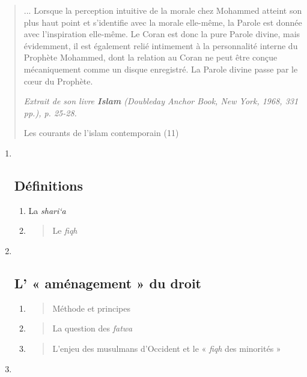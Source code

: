 \begin{quote}
... Lorsque la perception intuitive de la morale chez Mohammed atteint
son plus haut point et s'identifie avec la morale elle-même, la Parole
est donnée avec l'inspiration elle-même. Le Coran est donc la pure
Parole divine, mais évidemment, il est également relié intimement à la
personnalité interne du Prophète Mohammed, dont la relation au Coran ne
peut être conçue mécaniquement comme un disque enregistré. La Parole
divine passe par le cœur du Prophète.

\emph{Extrait de son livre \textbf{Islam} (Doubleday Anchor Book, New
York, 1968, 331 pp.), p. 25-28.}

Les courants de l'islam contemporain (11)
\end{quote}

\begin{enumerate}
\def\labelenumi{\Roman{enumi}.}
\item ~
  \hypertarget{duxe9finitions}{%
  \subsection{\texorpdfstring{
  {Définitions}}{ Définitions}}\label{duxe9finitions}}

  \begin{enumerate}
  \def\labelenumii{\arabic{enumii}.}
  \item
    La \emph{shari`a}
  \item
    \begin{quote}
    Le \emph{fiqh}
    \end{quote}
  \end{enumerate}
\item ~
  \hypertarget{l-amuxe9nagement-du-droit}{%
  \subsection{\texorpdfstring{{L' « aménagement » du
  droit}}{L' « aménagement » du droit}}\label{l-amuxe9nagement-du-droit}}

  \begin{enumerate}
  \def\labelenumii{\arabic{enumii}.}
  \item
    \begin{quote}
    Méthode et principes
    \end{quote}
  \item
    \begin{quote}
    La question des \emph{fatwa}
    \end{quote}
  \item
    \begin{quote}
    L'enjeu des musulmans d'Occident et le « \emph{fiqh} des minorités »
    \end{quote}
  \end{enumerate}
\item ~
  \hypertarget{repenser-la-norme}{%
}
\end{enumerate}
